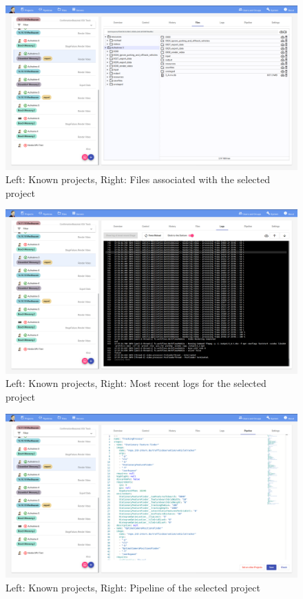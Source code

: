 \begin{figure}[H]
	\centering
	\includegraphics[width=1.0\textwidth]{screenshots/04_project_files.png}
	\caption{Left: Known projects, Right: Files associated with the selected project}
\end{figure}

\begin{figure}[H]
	\centering
	\includegraphics[width=1.0\textwidth]{screenshots/05_project_logs.png}
	\caption{Left: Known projects, Right: Most recent logs for the selected project}
\end{figure}

\begin{figure}[H]
	\centering
	\includegraphics[width=1.0\textwidth]{screenshots/06_project_pipeline.png}
	\caption{Left: Known projects, Right: Pipeline of the selected project}
\end{figure}

